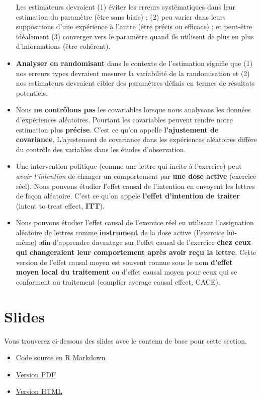 \documentclass[12pt,]{book}
\begin{document}
\begin{itemize}
  Les estimateurs devraient (1) éviter les erreurs systématiques dans leur estimation du paramètre (être sans biais) ; (2) peu varier dans leurs suppositions d'une expérience à l'autre (être précis ou efficace) ; et peut-être idéalement (3) converger vers le paramètre quand ils utilisent de plus en plus d'informations (être cohérent).
\item
  \textbf{Analyser en randomisant} dans le contexte de l'estimation signifie que (1) nos erreurs types devraient mesurer la variabilité de la randomisation et (2) nos estimateurs devraient cibler des paramètres définis en termes de résultats potentiels.
\item
  Nous \textbf{ne contrôlons pas} les covariables lorsque nous analysons les données d'expériences aléatoires. Pourtant les covariables peuvent rendre notre estimation plus \textbf{précise}. C'est ce qu'on appelle \textbf{l'ajustement de covariance}. L'ajustement de covariance dans les expériences aléatoires diffère du contrôle des variables dans les études d'observation.
\item
  Une intervention politique (comme une lettre qui incite à l'exercice) peut \emph{avoir l'intention} de changer un comportement par \textbf{une dose active} (exercice réel). Nous pouvons étudier l'effet causal de l'intention en envoyent les lettres de façon aléatoire. C'est ce qu'on appele \textbf{l'effet d'intention de traiter} (intent to treat effect, \textbf{ITT}).
\item
  Nous pouvons étudier l'effet causal de l'exercice réel en utilisant l'assignation aléatoire de lettres comme \textbf{instrument} de la dose active (l'exercice lui-même) afin d'apprendre davantage sur l'effet causal de l'exercice \textbf{chez ceux qui changeraient leur comportement après avoir reçu la lettre}. Cette version de l'effet causal moyen est souvent connue sous le nom \textbf{d'effet moyen local du traitement} ou d'effet causal moyen pour ceux qui se conforment au traitement (complier average causal effect, CACE).
\end{itemize}

\hypertarget{slides-4}{%
\section{Slides}\label{slides-4}}

Vous trouverez ci-dessous des slides avec le contenu de base pour cette section.

\begin{itemize}
\item
  \href{https://egap.github.io/learningdays-resources/Slides_fr/estimation-slides.Rmd}{Code source en R Markdown}
\item
  \href{https://egap.github.io/learningdays-resources/Slides_fr/estimation-slides.pdf}{Version PDF}
\item
  \href{https://egap.github.io/learningdays-resources/Slides_fr/estimation-slides.html}{Version HTML}
\end{itemize}
\end{document}
